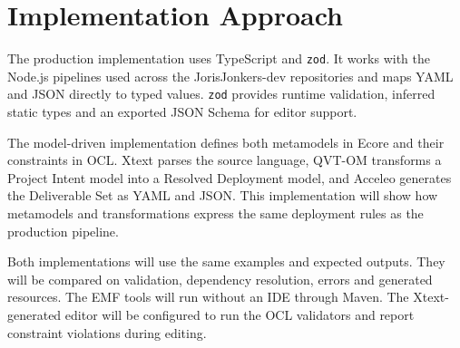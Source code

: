 \section{Implementation Approach}
\label{sec:tooling}

The production implementation uses TypeScript and \texttt{zod}. It works with
the Node.js pipelines used across the JorisJonkers-dev repositories and maps
YAML and JSON directly to typed values. \texttt{zod} provides runtime validation,
inferred static types and an exported JSON Schema for editor support.

The model-driven implementation defines both metamodels in Ecore and their
constraints in OCL. Xtext parses the source language, QVT-OM transforms a
Project Intent model into a Resolved Deployment model, and Acceleo generates
the Deliverable Set as YAML and JSON. This implementation will show how
metamodels and transformations express the same deployment rules as the
production pipeline.

Both implementations will use the same examples and expected outputs. They will
be compared on validation, dependency resolution, errors and generated
resources. The EMF tools will run without an IDE through Maven. The
Xtext-generated editor will be configured to run the OCL validators and report
constraint violations during editing.
